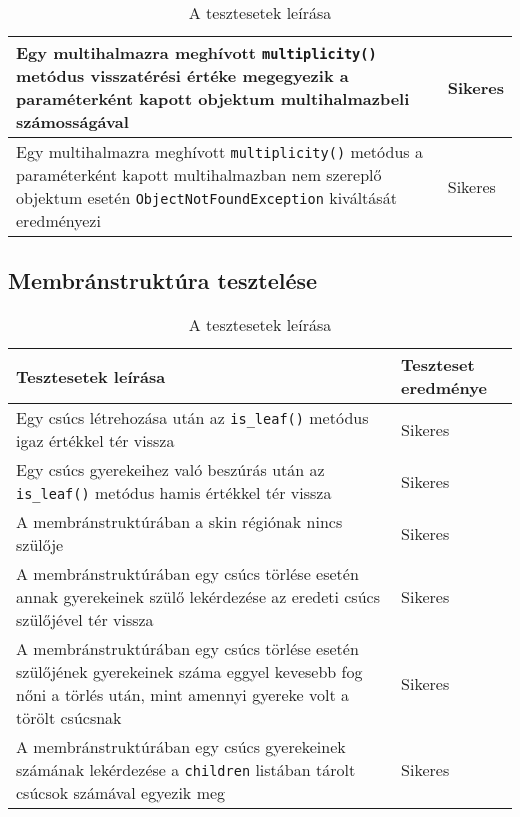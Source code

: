 \begin{table}[H]
\begin{tabular}{ | m{} | m{} | }
		Egy multihalmazra meghívott \verb|multiplicity()| metódus visszatérési értéke megegyezik a paraméterként kapott objektum multihalmazbeli számosságával &  Sikeres \\
		\hline
		
				Egy multihalmazra meghívott \verb|multiplicity()| metódus a paraméterként kapott multihalmazban nem szereplő objektum esetén \verb|ObjectNotFoundException| kiváltását eredményezi  &  Sikeres \\
		\hline
	\end{tabular}
	\caption{A tesztesetek leírása}
	\label{tab:test_cases_multiset}
\end{table}

\subsection{Membránstruktúra tesztelése}

\begin{table}[H]
	\centering
	\begin{tabular}{ | m{} | m{} | }
		\hline
		\textbf{Tesztesetek leírása} & \textbf{Teszteset eredménye} \\
		\hline \hline
		Egy csúcs létrehozása után az \verb|is_leaf()| metódus igaz értékkel tér vissza & Sikeres \\
		\hline
		Egy csúcs gyerekeihez való beszúrás után az \verb|is_leaf()| metódus hamis értékkel tér vissza & Sikeres \\
		\hline
		
		A membránstruktúrában a skin régiónak nincs szülője & Sikeres \\
		\hline
		
		A membránstruktúrában egy csúcs törlése esetén annak gyerekeinek szülő lekérdezése az eredeti csúcs szülőjével tér vissza & Sikeres \\
		\hline
	A membránstruktúrában egy csúcs törlése esetén szülőjének gyerekeinek száma eggyel kevesebb fog nőni a törlés után, mint amennyi gyereke volt a törölt csúcsnak & Sikeres \\
		\hline
		
			A membránstruktúrában egy csúcs gyerekeinek számának lekérdezése a \verb|children| listában tárolt csúcsok számával egyezik meg & Sikeres \\
		\hline
	\end{tabular}
	\caption{A tesztesetek leírása}
	\label{tab:test_cases_structure}
\end{table}

